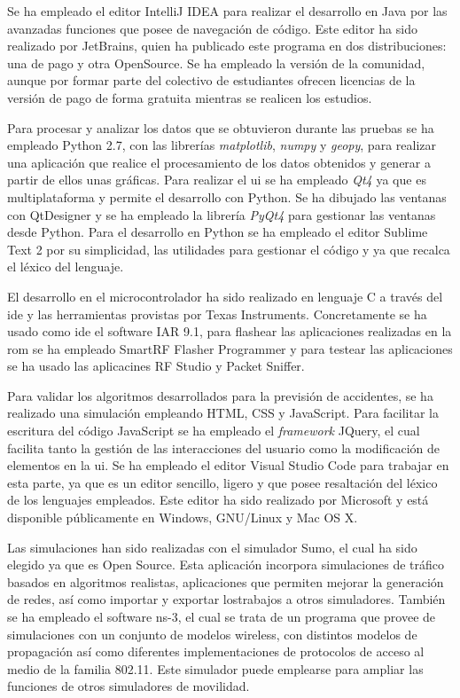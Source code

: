 Se ha empleado el editor IntelliJ IDEA para realizar el desarrollo en Java por
las avanzadas funciones que posee de navegación de código. Este editor ha sido
realizado por JetBrains, quien ha publicado este programa en dos distribuciones:
una de pago y otra OpenSource. Se ha empleado la versión de la comunidad,
aunque por formar parte del colectivo de estudiantes ofrecen licencias de la
versión de pago de forma gratuita mientras se realicen los estudios.

Para procesar y analizar los datos que se obtuvieron durante las pruebas se ha
empleado Python 2.7, con las librerías \emph{matplotlib}, \emph{numpy} y
\emph{geopy}, para realizar una aplicación que realice el procesamiento de
los datos obtenidos y generar a partir de ellos unas gráficas. Para realizar
el \gls{ui} se ha empleado \emph{Qt4} ya que es multiplataforma y permite
el desarrollo con Python. Se ha dibujado las ventanas con QtDesigner y se ha
empleado la librería \emph{PyQt4} para gestionar las ventanas desde Python.
Para el desarrollo en Python se ha empleado el editor Sublime Text 2 por su
simplicidad, las utilidades para gestionar el código y ya que recalca el léxico
del lenguaje.

El desarrollo en el microcontrolador ha sido realizado en lenguaje C a través
del \gls{ide} y las herramientas provistas por Texas Instruments. Concretamente
se ha usado como \gls{ide} el software IAR 9.1, para flashear las aplicaciones
realizadas en la \gls{rom} se ha empleado SmartRF Flasher Programmer y para
testear las aplicaciones se ha usado las aplicacines RF Studio y Packet Sniffer.

Para validar los algoritmos desarrollados para la previsión de accidentes, se
ha realizado una simulación empleando HTML, CSS y JavaScript. Para facilitar
la escritura del código JavaScript se ha empleado el \emph{framework} JQuery,
el cual facilita tanto la gestión de las interacciones del usuario como la
modificación de elementos en la \gls{ui}. Se ha empleado el editor Visual
Studio Code para trabajar en esta parte, ya que es un editor sencillo, ligero
y que posee resaltación del léxico de los lenguajes empleados. Este editor ha
sido realizado por Microsoft y está disponible públicamente en Windows,
GNU/Linux y Mac OS X.

Las simulaciones han sido realizadas con el simulador Sumo, el cual ha sido
elegido ya que es Open Source. Esta aplicación incorpora simulaciones de
tráfico basados en algoritmos realistas, aplicaciones que permiten mejorar la
generación de redes, así como importar y exportar lostrabajos a otros
simuladores. También se ha empleado el software ns-3, el cual se trata de un
programa que provee de simulaciones con un conjunto de modelos wireless, con
distintos modelos de propagación así como diferentes implementaciones de
protocolos de acceso al medio de la familia 802.11. Este simulador
puede emplearse para ampliar las funciones de otros simuladores de movilidad.

